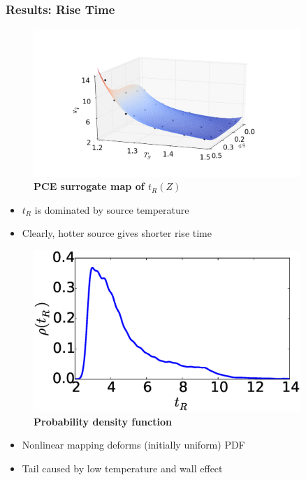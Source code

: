 \documentclass[9pt]{beamer}
\begin{document}
\begin{frame}
\frametitle{Results: Rise Time}
\label{sec-7-4}


\centering
\begin{minipage}[b]{0.45\linewidth}
\begin{figure}[ht]
\includegraphics[width=0.9\textwidth,trim = 40mm 0mm 40mm 0mm,clip]{PCEMapTR_matplotlib} \\
\textbf{PCE surrogate map of $t_R(Z)$} \\
\end{figure}
\begin{itemize}
\item $t_R$ is dominated by source temperature
\item Clearly, hotter source gives shorter rise time
\end{itemize}
\end{minipage}
\begin{minipage}[b]{0.45\linewidth}
\begin{figure}[ht]
\includegraphics[width=0.9\textwidth]{PCEStatTR_matplotlib} \\
\textbf{Probability density function} \\
\end{figure}
\begin{itemize}
\item Nonlinear mapping deforms (initially uniform) PDF
\item Tail caused by low temperature and wall effect
\end{itemize}
\end{minipage}
\end{frame}
\end{document}
